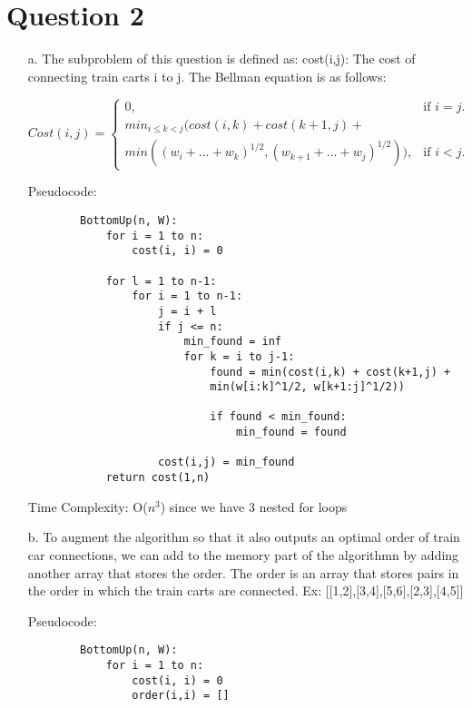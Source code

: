 \documentclass[12pt]{article}
\begin{document}
\section*{Question 2}
\begin{enumerate}
    \item[a.] The subproblem of this question is defined as:
    cost(i,j): The cost of connecting train carts i to j. The Bellman equation is as follows:

    \begin{equation}
        Cost(i,j)=\begin{cases}
    0, & \text{if $i=j$}.\\
    min_{i \leq k < j}(cost(i,k) + cost(k+1, j) + \\min((w_{i} + ... + w_{k})^{1/2},(w_{k+1} + ... + w_{j})^{1/2})), & \text{if $i < j$}.
    \end{cases}
    \end{equation}

    Pseudocode:
    \begin{verbatim}
        BottomUp(n, W):
            for i = 1 to n:
                cost(i, i) = 0
            
            for l = 1 to n-1:
                for i = 1 to n-1:
                    j = i + l
                    if j <= n:
                        min_found = inf
                        for k = i to j-1:
                            found = min(cost(i,k) + cost(k+1,j) + 
                            min(w[i:k]^1/2, w[k+1:j]^1/2))

                            if found < min_found:
                                min_found = found

                    cost(i,j) = min_found
            return cost(1,n)
    \end{verbatim}

    Time Complexity: O($n^3$) since we have 3 nested for loops 

    \item[b. ] To augment the algorithm so that it also outputs an optimal order
    of train car connections, we can add to the memory part of the algorithmn by
    adding another array that stores the order. The order is an array that stores
    pairs in the order in which the train carts are connected. 
    Ex: [[1,2],[3,4],[5,6],[2,3],[4,5]] 
    
    Pseudocode:
    \begin{verbatim}
        BottomUp(n, W):
            for i = 1 to n:
                cost(i, i) = 0
                order(i,i) = []
            

\end{verbatim}
\end{enumerate}
\end{document}
